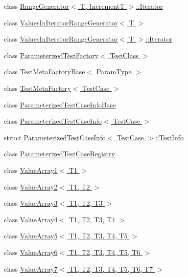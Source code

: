 \begin{DoxyCompactItemize}
class \hyperlink{classtesting_1_1internal_1_1RangeGenerator_1_1Iterator}{\-Range\-Generator$<$ T, Increment\-T $>$\-::\-Iterator}
\item 
class \hyperlink{classtesting_1_1internal_1_1ValuesInIteratorRangeGenerator}{\-Values\-In\-Iterator\-Range\-Generator$<$ T $>$}
\item 
class \hyperlink{classtesting_1_1internal_1_1ValuesInIteratorRangeGenerator_1_1Iterator}{\-Values\-In\-Iterator\-Range\-Generator$<$ T $>$\-::\-Iterator}
\item 
class \hyperlink{classtesting_1_1internal_1_1ParameterizedTestFactory}{\-Parameterized\-Test\-Factory$<$ Test\-Class $>$}
\item 
class \hyperlink{classtesting_1_1internal_1_1TestMetaFactoryBase}{\-Test\-Meta\-Factory\-Base$<$ Param\-Type $>$}
\item 
class \hyperlink{classtesting_1_1internal_1_1TestMetaFactory}{\-Test\-Meta\-Factory$<$ Test\-Case $>$}
\item 
class \hyperlink{classtesting_1_1internal_1_1ParameterizedTestCaseInfoBase}{\-Parameterized\-Test\-Case\-Info\-Base}
\item 
class \hyperlink{classtesting_1_1internal_1_1ParameterizedTestCaseInfo}{\-Parameterized\-Test\-Case\-Info$<$ Test\-Case $>$}
\item 
struct \hyperlink{structtesting_1_1internal_1_1ParameterizedTestCaseInfo_1_1TestInfo}{\-Parameterized\-Test\-Case\-Info$<$ Test\-Case $>$\-::\-Test\-Info}
\item 
class \hyperlink{classtesting_1_1internal_1_1ParameterizedTestCaseRegistry}{\-Parameterized\-Test\-Case\-Registry}
\item 
class \hyperlink{classtesting_1_1internal_1_1ValueArray1}{\-Value\-Array1$<$ T1 $>$}
\item 
class \hyperlink{classtesting_1_1internal_1_1ValueArray2}{\-Value\-Array2$<$ T1, T2 $>$}
\item 
class \hyperlink{classtesting_1_1internal_1_1ValueArray3}{\-Value\-Array3$<$ T1, T2, T3 $>$}
\item 
class \hyperlink{classtesting_1_1internal_1_1ValueArray4}{\-Value\-Array4$<$ T1, T2, T3, T4 $>$}
\item 
class \hyperlink{classtesting_1_1internal_1_1ValueArray5}{\-Value\-Array5$<$ T1, T2, T3, T4, T5 $>$}
\item 
class \hyperlink{classtesting_1_1internal_1_1ValueArray6}{\-Value\-Array6$<$ T1, T2, T3, T4, T5, T6 $>$}
\item 
class \hyperlink{classtesting_1_1internal_1_1ValueArray7}{\-Value\-Array7$<$ T1, T2, T3, T4, T5, T6, T7 $>$}

\end{DoxyCompactItemize}
